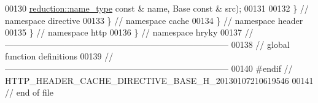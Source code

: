 \begin{DoxyCode}
00130         \hyperlink{namespacehryky_1_1reduction_ac686c30a4c8d196bbd0f05629a6b921f}{reduction::name_type} \textcolor{keyword}{const} & name, Base \textcolor{keyword}{const} & src);
00131 
00132 \} \textcolor{comment}{// namespace directive}
00133 \} \textcolor{comment}{// namespace cache}
00134 \} \textcolor{comment}{// namespace header}
00135 \} \textcolor{comment}{// namespace http}
00136 \} \textcolor{comment}{// namespace hryky}
00137 \textcolor{comment}{//
      ------------------------------------------------------------------------------}
00138 \textcolor{comment}{// global function definitions}
00139 \textcolor{comment}{//
      ------------------------------------------------------------------------------}
00140 \textcolor{preprocessor}{#endif // HTTP\_HEADER\_CACHE\_DIRECTIVE\_BASE\_H\_20130107210619546}
00141 \textcolor{preprocessor}{}\textcolor{comment}{// end of file}
\end{DoxyCode}
